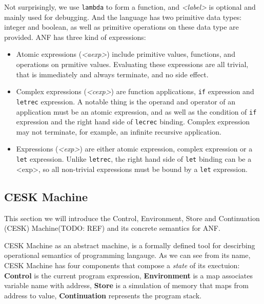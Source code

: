 \documentclass[paper=a4, fontsize=11pt]{scrartcl} %
\numberwithin{equation}{section} %
\numberwithin{figure}{section} %
\numberwithin{table}{section} %
\begin{document}
Not surprisingly, we use \texttt{lambda} to form a function, and \textit{<label>} is optional and mainly used for debugging. And the language has two primitive data types: integer and boolean, as well as primitive operations on these data type are provided. ANF has three kind of expressions:

\begin{itemize}
\item Atomic expressions (\textit{<aexp>}) include primitive values, functions, and operations on prmitive values. Evaluating these expressions are all trivial, that is immediately and always terminate, and no side effect.

\item Complex expressions (\textit{<cexp>}) are function applications, \texttt{if} expression and \texttt{letrec} expression. A notable thing is the operand and operator of an application must be an atomic expression, and as well as the condition of \texttt{if} expression and the right hand side of \texttt{lecrec} binding. Complex expression may not terminate, for example, an infinite recursive application.

\item Expressions (\textit{<exp>}) are either atomic expression, complex expression or a \texttt{let} expression. Unlike \texttt{letrec}, the right hand side of \texttt{let} binding can be a <exp>, so all non-trivial expressions must be bound by a \texttt{let} expression.
\end{itemize}


\subsection{CESK Machine}

This section we will introduce the Control, Environment, Store and Continuation (CESK) Machine(TODO: REF) and its concrete semantics for ANF.

CESK Machine as an abstract machine, is a formally defined tool for descirbing operational semantics of programming langauge. As we can see from its name, CESK Machine has four components that compose a \textit{state} of its exectuion: \textbf{Control} is the current program expression, \textbf{Environment} is a map associates variable name with address, \textbf{Store} is a simulation of memory that maps from address to value, \textbf{Continuation} represents the program stack. 
\end{document}
